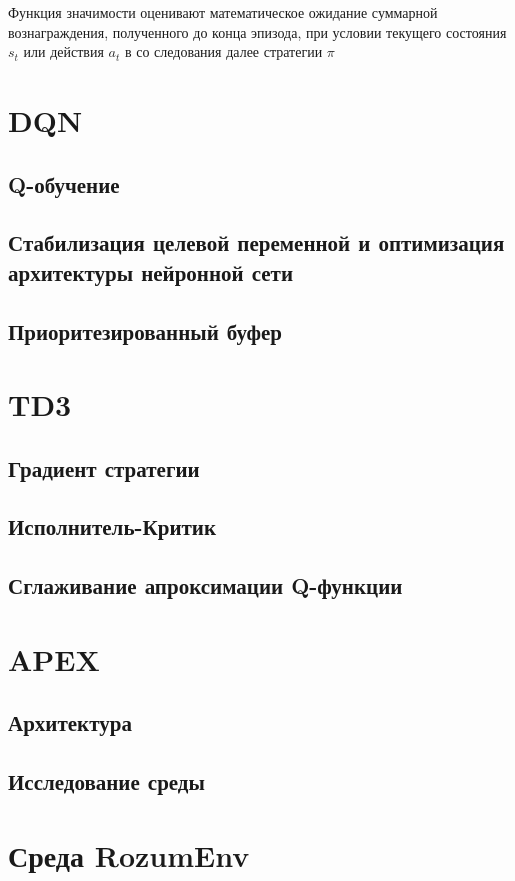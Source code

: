 \documentclass{mipt-thesis-bs}
\begin{document}
Функция значимости оценивают математическое ожидание суммарной вознаграждения, полученного до конца эпизода, при условии текущего состояния $s_t$ или действия $a_t$ в со следования далее стратегии $\pi$

\chapter{DQN}
\section{Q-обучение}
\section{Стабилизация целевой переменной и оптимизация архитектуры нейронной сети}
\section{Приоритезированный буфер}


\chapter{TD3}
\section{Градиент стратегии}
\section{Исполнитель-Критик}
\section{Сглаживание апроксимации Q-функции}


\chapter{APEX}
\section{Архитектура}
\section{Исследование среды}

\chapter{Среда RozumEnv}
\end{document}
